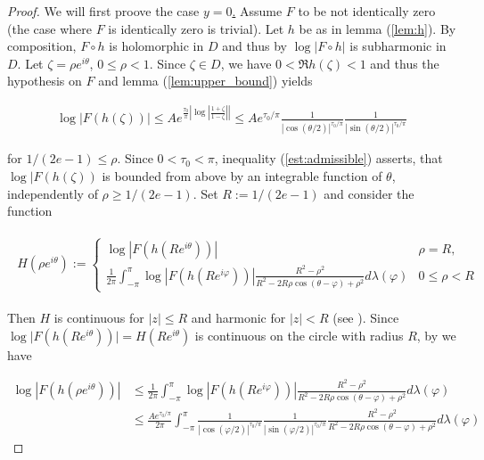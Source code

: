 \begin{proof}
	We will first proove the case \underline{$y = 0$.} Assume $F$ to be not identically zero (the case where $F$ is identically zero is trivial). Let $h$ be as in lemma (\ref{lem:h}). By composition, $F \circ h$ is holomorphic in $D$ and thus by \cite[336]{rudin:rc_analysis:1987} $\log\vert F \circ h \vert$ is subharmonic in $D$. Let $\zeta = \rho e^{i\theta}$, $0 \leqslant \rho < 1$. Since $\zeta \in D$, we have $0 < \Re h(\zeta) < 1$ and thus the hypothesis on $F$ and lemma (\ref{lem:upper_bound}) yields

\begin{gather}
	\log \vert F(h(\zeta)) \vert \leqslant Ae^{\frac{\tau_0}{\pi}\left| \log\left| \frac{1 + \zeta}{1 - \zeta}\right|\right|} \leqslant Ae^{\tau_0/\pi}\frac{1}{\left| \cos(\theta/2) \right|^{\tau_0/\pi}}\frac{1}{\left| \sin(\theta/2) \right|^{\tau_0/\pi}}
	\label{est:admissible}
\end{gather}

	for $1/(2e - 1) \leqslant \rho$. Since $0 < \tau_0 < \pi$, inequality (\ref{est:admissible}) asserts, that $\log \vert F(h(\zeta))$ is bounded from above by an integrable function of $\theta$, independently of $\rho \geqslant 1/(2e - 1)$. Set $R := 1/(2e - 1)$ and consider the function
	 
\begin{gather*}
	\begin{aligned}
		H(\rho e^{i\theta}):= \begin{cases}
			\log \left| F(h(Re^{i\theta}))\right| & \rho = R,\\
			\displaystyle \frac{1}{2\pi} \int_{-\pi}^\pi \log\left| F(h(Re^{i\varphi}))\right| \frac{R^2 - \rho^2}{R^2 - 2R\rho \cos(\theta - \varphi) + \rho^2} d\lambda(\varphi) & 0 \leqslant \rho < R
	\end{cases}
	\end{aligned}
\end{gather*}

Then $H$ is continuous for $\vert z \vert \leqslant R$ and harmonic for $\vert z \vert < R$ (see \cite[234--235]{rudin:rc_analysis:1987}). Since $\log\vert F(h(Re^{i\theta}))\vert = H(Re^{i\theta})$ is continuous on the circle with radius $R$, by \cite[336]{rudin:rc_analysis:1987} we have

\begin{equation*}
	\begin{aligned}
		\log\left| F(h(\rho e^{i\theta}))\right| &\leqslant \frac{1}{2\pi} \int_{-\pi}^\pi \log\left| F(h(Re^{i\varphi}))\right| \frac{R^2 - \rho^2}{R^2 - 2R\rho\cos(\theta - \varphi) + \rho^2} d\lambda(\varphi)\\
		&\leqslant \frac{Ae^{\tau_0/\pi}}{2\pi}\int_{-\pi}^\pi\frac{1}{\left| \cos(\varphi/2) \right|^{\tau_0/\pi}}\frac{1}{\left| \sin(\varphi/2) \right|^{\tau_0/\pi}}\frac{R^2 - \rho^2}{R^2 - 2R\rho\cos(\theta - \varphi) + \rho^2} d\lambda(\varphi)
	\end{aligned}
\end{equation*}


\end{proof}
